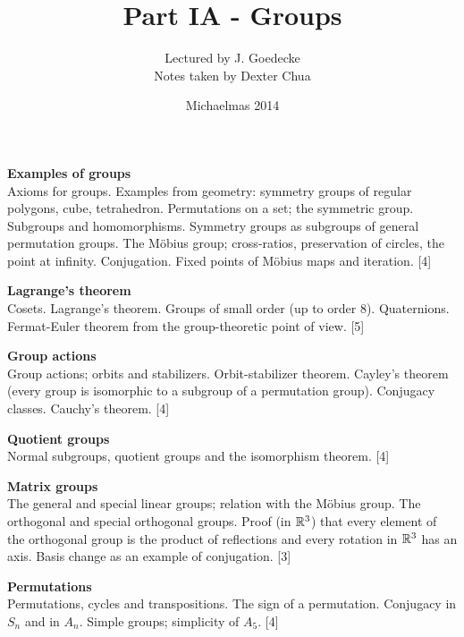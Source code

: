 \documentclass[a4paper]{article}
\title{Part IA - Groups}
\author{Lectured by J. Goedecke\\\small Notes taken by Dexter Chua}
\date{Michaelmas 2014}
\begin{document}
\maketitle
{\small
  \noindent\textbf{Examples of groups}\\
  Axioms for groups. Examples from geometry: symmetry groups of regular polygons, cube, tetrahedron. Permutations on a set; the symmetric group. Subgroups and homomorphisms. Symmetry groups as subgroups of general permutation groups. The M\"obius group; cross-ratios, preservation of circles, the point at infinity. Conjugation. Fixed points of M\"obius maps and iteration.\hspace*{\fill} [4]

  \vspace{10pt}
  \noindent\textbf{Lagrange’s theorem}\\
  Cosets. Lagrange’s theorem. Groups of small order (up to order 8). Quaternions. Fermat-Euler theorem from the group-theoretic point of view.\hspace*{\fill} [5]

  \vspace{10pt}
  \noindent\textbf{Group actions}\\
  Group actions; orbits and stabilizers. Orbit-stabilizer theorem. Cayley's theorem (every group is isomorphic to a subgroup of a permutation group). Conjugacy classes. Cauchy's theorem.\hspace*{\fill} [4]

  \vspace{10pt}
  \noindent\textbf{Quotient groups}\\
  Normal subgroups, quotient groups and the isomorphism theorem.\hspace*{\fill} [4]

  \vspace{10pt}
  \noindent
  \textbf{Matrix groups}\\
  The general and special linear groups; relation with the M\"obius group. The orthogonal and special orthogonal groups. Proof (in $\mathbb{R}^3$) that every element of the orthogonal group is the product of reflections and every rotation in $\mathbb{R}^3$ has an axis. Basis change as an example of conjugation.\hspace*{\fill} [3]

  \vspace{10pt}
  \noindent\textbf{Permutations}\\
  Permutations, cycles and transpositions. The sign of a permutation. Conjugacy in $S_n$ and in $A_n$. Simple groups; simplicity of $A_5$.\hspace*{\fill} [4]}
  \tableofcontents
  \newpage
\end{document}
